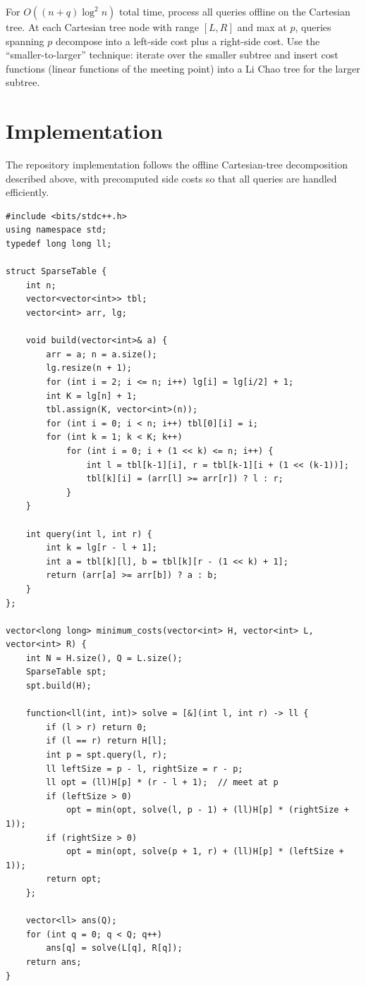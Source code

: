 \documentclass[11pt,a4paper]{article}
\begin{document}
For $O((n + q) \log^2 n)$ total time, process all queries offline on the Cartesian tree. At each Cartesian tree node with range $[L, R]$ and max at $p$, queries spanning $p$ decompose into a left-side cost plus a right-side cost. Use the ``smaller-to-larger'' technique: iterate over the smaller subtree and insert cost functions (linear functions of the meeting point) into a Li Chao tree for the larger subtree.

\section{Implementation}

The repository implementation follows the offline Cartesian-tree decomposition described above, with precomputed side costs so that all queries are handled efficiently.

\begin{lstlisting}
#include <bits/stdc++.h>
using namespace std;
typedef long long ll;

struct SparseTable {
    int n;
    vector<vector<int>> tbl;
    vector<int> arr, lg;

    void build(vector<int>& a) {
        arr = a; n = a.size();
        lg.resize(n + 1);
        for (int i = 2; i <= n; i++) lg[i] = lg[i/2] + 1;
        int K = lg[n] + 1;
        tbl.assign(K, vector<int>(n));
        for (int i = 0; i < n; i++) tbl[0][i] = i;
        for (int k = 1; k < K; k++)
            for (int i = 0; i + (1 << k) <= n; i++) {
                int l = tbl[k-1][i], r = tbl[k-1][i + (1 << (k-1))];
                tbl[k][i] = (arr[l] >= arr[r]) ? l : r;
            }
    }

    int query(int l, int r) {
        int k = lg[r - l + 1];
        int a = tbl[k][l], b = tbl[k][r - (1 << k) + 1];
        return (arr[a] >= arr[b]) ? a : b;
    }
};

vector<long long> minimum_costs(vector<int> H, vector<int> L, vector<int> R) {
    int N = H.size(), Q = L.size();
    SparseTable spt;
    spt.build(H);

    function<ll(int, int)> solve = [&](int l, int r) -> ll {
        if (l > r) return 0;
        if (l == r) return H[l];
        int p = spt.query(l, r);
        ll leftSize = p - l, rightSize = r - p;
        ll opt = (ll)H[p] * (r - l + 1);  // meet at p
        if (leftSize > 0)
            opt = min(opt, solve(l, p - 1) + (ll)H[p] * (rightSize + 1));
        if (rightSize > 0)
            opt = min(opt, solve(p + 1, r) + (ll)H[p] * (leftSize + 1));
        return opt;
    };

    vector<ll> ans(Q);
    for (int q = 0; q < Q; q++)
        ans[q] = solve(L[q], R[q]);
    return ans;
}
\end{lstlisting}
\end{document}
